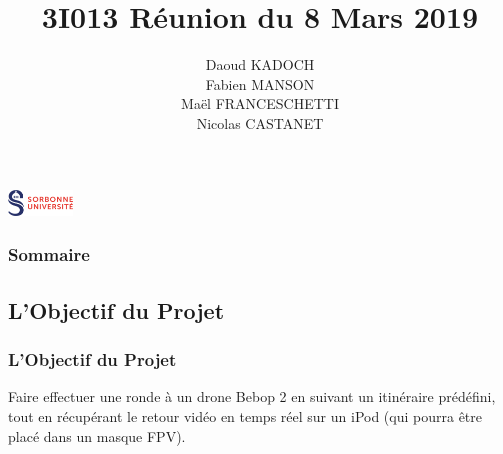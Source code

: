 \documentclass{beamer}
\title{3I013 Réunion du 8 Mars 2019}
\author{Daoud KADOCH\\Fabien MANSON\\Maël FRANCESCHETTI\\Nicolas CASTANET}
\begin{document}
	\begin{frame}
		\begin{center}
		\maketitle
		\includegraphics[height=0.7cm]{logo_sorbonne.png}
		\end{center}
	\end{frame}
	\begin{frame}
		\begin{center}
		\frametitle{Sommaire}
		\tableofcontents{}
		\end{center}
	\end{frame}
	\begin{frame}
	\section{L'Objectif du Projet}
		\begin{center}
		\frametitle{L'Objectif du Projet}
		   Faire effectuer une ronde à un drone Bebop 2 en suivant un itinéraire prédéfini, tout en récupérant le retour vidéo en temps réel sur un iPod (qui pourra être placé dans un masque FPV).
		\end{center}
	\end{frame}
\end{document}
